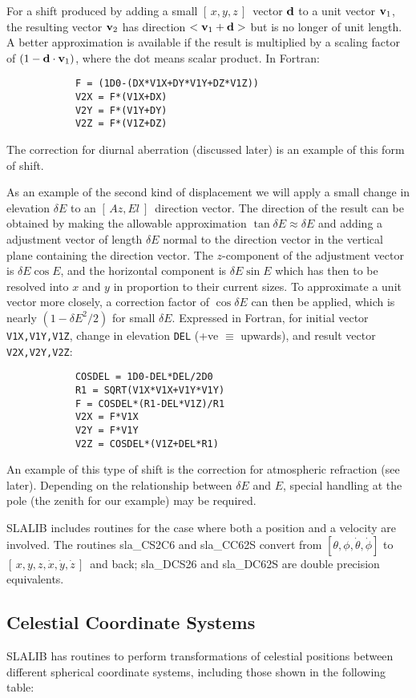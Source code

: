 \documentclass[11pt,twoside]{article}
\newcommand{\azel}      {$[\,Az,El~]$}
\newcommand{\xyz}       {$[\,x,y,z\,]$}
\newcommand{\xyzxyzd}   {$[\,x,y,z,\dot{x},\dot{y},\dot{z}\,]$}
\begin{document}
For a shift produced by adding a small \xyz\ vector ${\bf d}$ to a
unit vector ${\bf v}_1$, the resulting vector ${\bf v}_2$ has direction
$<{\bf v}_1+{\bf d}>$ but is no longer of unit length.  A better approximation
is available if the result is multiplied by a scaling factor of
$(1-{\bf d}\cdot{\bf v}_1)$, where the dot
means scalar product.  In Fortran:
\goodbreak
\begin{verbatim}
            F = (1D0-(DX*V1X+DY*V1Y+DZ*V1Z))
            V2X = F*(V1X+DX)
            V2Y = F*(V1Y+DY)
            V2Z = F*(V1Z+DZ)
\end{verbatim}
\goodbreak
\noindent
The correction for diurnal aberration (discussed later) is
an example of this form of shift.

As an example of the second kind of displacement
we will apply a small change in elevation $\delta E$ to an
\azel\ direction vector.  The direction of the
result can be obtained by making the allowable approximation
${\tan \delta E\approx\delta E}$ and adding a adjustment
vector of length $\delta E$ normal
to the direction vector in the vertical plane containing the direction
vector.  The $z$-component of the adjustment vector is
$\delta E \cos E$,
and the horizontal component is
$\delta E \sin E$ which has then to be
resolved into $x$ and $y$ in proportion to their current sizes. To
approximate a unit vector more closely, a correction factor of
$\cos \delta E$ can then be applied, which is nearly
$(1-\delta E^2 /2)$ for
small $\delta E$.  Expressed in Fortran, for initial vector
{\tt V1X,V1Y,V1Z}, change in elevation {\tt DEL}
(+ve $\equiv$ upwards), and result
vector {\tt V2X,V2Y,V2Z}:
\goodbreak
\begin{verbatim}
            COSDEL = 1D0-DEL*DEL/2D0
            R1 = SQRT(V1X*V1X+V1Y*V1Y)
            F = COSDEL*(R1-DEL*V1Z)/R1
            V2X = F*V1X
            V2Y = F*V1Y
            V2Z = COSDEL*(V1Z+DEL*R1)
\end{verbatim}
\goodbreak
An example of this type of shift is the correction for atmospheric
refraction (see later).
Depending on the relationship between $\delta E$ and $E$, special
handling at the pole (the zenith for our example) may be required.

SLALIB includes routines for the case where both a position
and a velocity are involved.  The routines
sla\_CS2C6
and
sla\_CC62S
convert from $[\theta,\phi,\dot{\theta},\dot{\phi}]$
to \xyzxyzd\ and back;
sla\_DCS26
and
sla\_DC62S
are double precision equivalents.

\subsection {Celestial Coordinate Systems}
SLALIB has routines to perform transformations
of celestial positions between different spherical
coordinate systems, including those shown in the following table:
\end{document}
